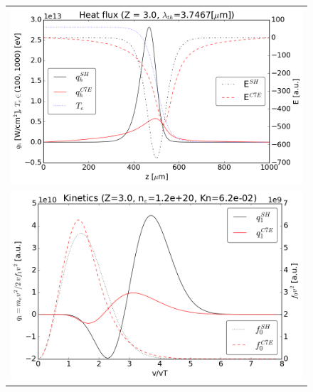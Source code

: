 \documentclass[preprint,12pt]{elsarticle}
\begin{document}
\begin{figure}[tbh]
  \begin{center}
    \begin{tabular}{c}
      \includegraphics[width=1.0\textwidth]{../results/fe_analysis/C7E/P5_heatflux_Z3_fifthF.png} \\ 
      \includegraphics[width=1.0\textwidth]{../results/fe_analysis/C7E/P5_kinetics_Z3_fifthF.png}
    \end{tabular}
  \caption{
  }
  \end{center}
  \label{fig:AWBScorrection_f1}
\end{figure}
\end{document}
